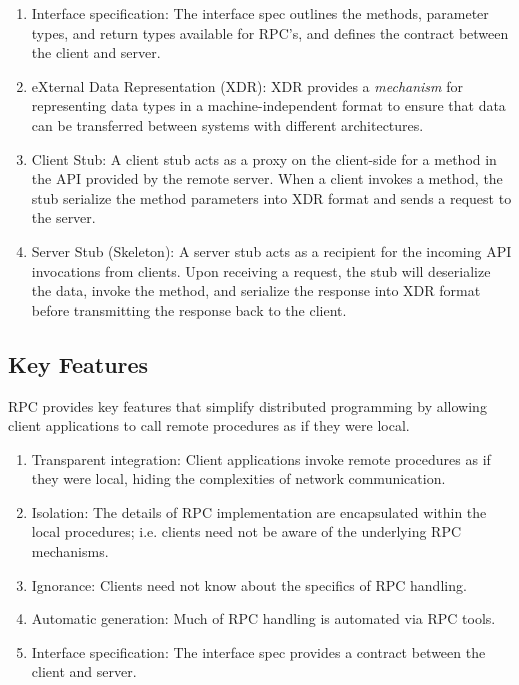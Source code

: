 \documentclass{report}
\begin{document}
\begin{enumerate}[label=\textit{(\roman*)}]
\item Interface specification: The interface spec outlines the methods, parameter types, and return
  types available for RPC's, and defines the contract between the client and server.
\item eXternal Data Representation (XDR): XDR provides a \textit{mechanism} for representing data
  types in a machine-independent format to ensure that data can be transferred between systems with
  different architectures.
\item Client Stub: A client stub acts as a proxy on the client-side for a method in the API
  provided by the remote server. When a client invokes a method, the stub serialize the method
  parameters into XDR format and sends a request to the server.
\item Server Stub (Skeleton): A server stub acts as a recipient for the incoming API invocations
  from clients. Upon receiving a request, the stub will deserialize the data, invoke the method, and
  serialize the response into XDR format before transmitting the response back to the client.
\end{enumerate}


\subsection{Key Features}
RPC provides key features that simplify distributed programming by allowing client applications to
call remote procedures as if they were local. 

\begin{enumerate}[label=\textit{(\roman*)}]
\item Transparent integration: Client applications invoke remote procedures as if they were
  local, hiding the complexities of network communication.
\item Isolation: The details of RPC implementation are encapsulated within the local procedures;
  i.e. clients need not be aware of the underlying RPC mechanisms.
\item Ignorance: Clients need not know about the specifics of RPC handling.
\item Automatic generation: Much of RPC handling is automated via RPC tools.
\item Interface specification: The interface spec provides a contract between the client and server.
\end{enumerate}
\end{document}
